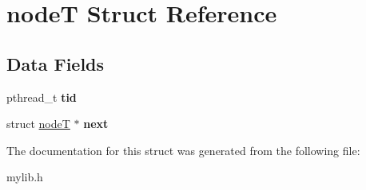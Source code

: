 \hypertarget{structnode_t}{}\section{nodeT Struct Reference}
\label{structnode_t}
\subsection*{Data Fields}
\begin{DoxyCompactItemize}
\item 
\mbox{\label{structnode_t_a3a5ba243b3ab4b6093afb178de0f9509}} 
pthread\+\_\+t {\bfseries tid}
\item 
\mbox{\label{structnode_t_a583a4a98fe2e5fb384e371f1c184baac}} 
struct \mbox{\hyperlink{structnode_t}{nodeT}} $\ast$ {\bfseries next}
\end{DoxyCompactItemize}


The documentation for this struct was generated from the following file\+:\begin{DoxyCompactItemize}
\item 
mylib.\+h\end{DoxyCompactItemize}
